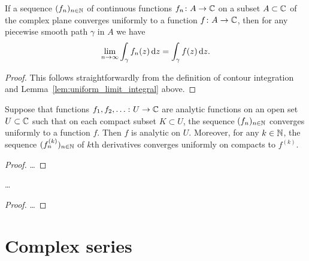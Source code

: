 \begin{corollary}
  \label{cor:uniform_limit_contour_integral}
  If a sequence $(f_n)_{n \in \mathbb{N}}$ of continuous functions
  $f_n \colon A \to \mathbb{C}$ on a subset $A \subset \mathbb{C}$  of the complex plane
  converges uniformly to a function
  $f \colon A \to \mathbb{C}$, then for any piecewise smooth path $\gamma$
  in $A$ we have
  \begin{align*}
    \lim_{n \to \infty} \int_\gamma f_n(z) \, \mathrm{d} z
      = \int_\gamma f(z) \, \mathrm{d} z .
  \end{align*}
\end{corollary}
\begin{proof}
  This follows straightforwardly from the definition of contour integration
  and Lemma~\ref{lem:uniform_limit_integral} above.
\end{proof}

\begin{lemma}
  \label{lem:uoc_convergent_analytic}
  Suppose that functions $f_1, f_2, \ldots \colon U \to \mathbb{C}$
  are analytic functions on an open set $U \subset \mathbb{C}$
  such that on each compact subset $K \subset U$, the sequence
  $(f_n)_{n \in \mathbb{N}}$ converges uniformly to a
  function $f$. Then $f$ is analytic on $U$.
  Moreover, for any $k \in \mathbb{N}$, the sequence $(f^{(k)}_n)_{n \in \mathbb{N}}$
  of $k$th derivatives converges uniformly on compacts to $f^{(k)}$.
\end{lemma}
\begin{proof}
  \ldots
\end{proof}

\begin{lemma}
  \label{lem:cauchy_uniform_limit_criterion}
  \ldots
\end{lemma}
\begin{proof}
  \ldots
\end{proof}



\section{Complex series}

